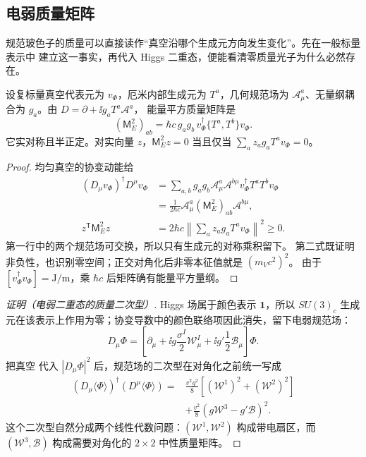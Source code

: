\subsection{电弱质量矩阵}

规范玻色子的质量可以直接读作“真空沿哪个生成元方向发生变化”。先在一般标量表示中
建立这一事实，再代入 Higgs 二重态，便能看清零质量光子为什么必然存在。
\begin{proposition}[规范质量二次型与真空稳定子]
设复标量真空代表元为 $v_\Phi$，厄米内部生成元为 $T^a$，几何规范场为
$\mathcal A_\mu^a$、无量纲耦合为 $g_a$。由 $D=\partial+\ii g_aT^a\mathcal A^a$，
能量平方质量矩阵是
\begin{equation}
(\mathsf M_E^2)_{ab}
=\hbar c\,g_ag_b\,v_\Phi^\dagger\{T^a,T^b\}v_\Phi.
\label{eq:sm-general-gauge-mass-gram-dp126}
\end{equation}
它实对称且半正定。对实向量 $z$，$\mathsf M_E^2z=0$ 当且仅当
$\sum_a z_ag_aT^av_\Phi=0$。
\end{proposition}
\begin{proof}
均匀真空的协变动能给
\begin{align*}
(D_\mu v_\Phi)^\dagger D^\mu v_\Phi
&=\sum_{a,b}g_ag_b\mathcal A_\mu^a\mathcal A^{b\mu}
v_\Phi^\dagger T^aT^bv_\Phi\\
&=\frac1{2\hbar c}\mathcal A_\mu^a(\mathsf M_E^2)_{ab}\mathcal A^{b\mu},\\
z^{\mathsf T}\mathsf M_E^2z
&=2\hbar c\left\|\sum_a z_ag_aT^av_\Phi\right\|^2\ge0.
\end{align*}
第一行中的两个规范场可交换，所以只有生成元的对称乘积留下。
第二式既证明非负性，也识别零空间；正交对角化后非零本征值就是 $(m_Vc^2)^2$。
由于 $[v_\Phi^\dagger v_\Phi]=\mathrm{J/m}$，乘 $\hbar c$ 后矩阵确有能量平方量纲。
\end{proof}

\begin{proof}[证明（电弱二重态的质量二次型）]
Higgs 场属于颜色表示 $\mathbf1$，所以 $SU(3)_c$ 生成元在该表示上作用为零；协变导数中的颜色联络项因此消失，留下电弱规范场：
\begin{equation*}
 D_\mu\Phi
 =\left[
 \partial_\mu
 +\ii g\frac{\sigma^I}{2}\mathcal W_\mu^I
 +\ii g'\frac12\mathcal B_\mu
 \right]\Phi.
\end{equation*}
把真空 代入 $|D_\mu\Phi|^2$ 后，规范场的二次型在对角化之前统一写成
\begin{align}
 (D_\mu\langle\Phi\rangle)^\dagger(D^\mu\langle\Phi\rangle)
 =&\frac{v^2g^2}{8}\left[(\mathcal W^1)^2+(\mathcal W^2)^2\right]\\
 &+\frac{v^2}{8}(g\mathcal W^3-g'\mathcal B)^2.
 \label{eq:sm-gauge-mass-before-diagonal-dp11}
\end{align}
这个二次型自然分成两个线性代数问题：$(\mathcal W^1,\mathcal W^2)$ 构成带电扇区，而 $(\mathcal W^3,\mathcal B)$ 构成需要对角化的 $2\times2$ 中性质量矩阵。
\end{proof}

